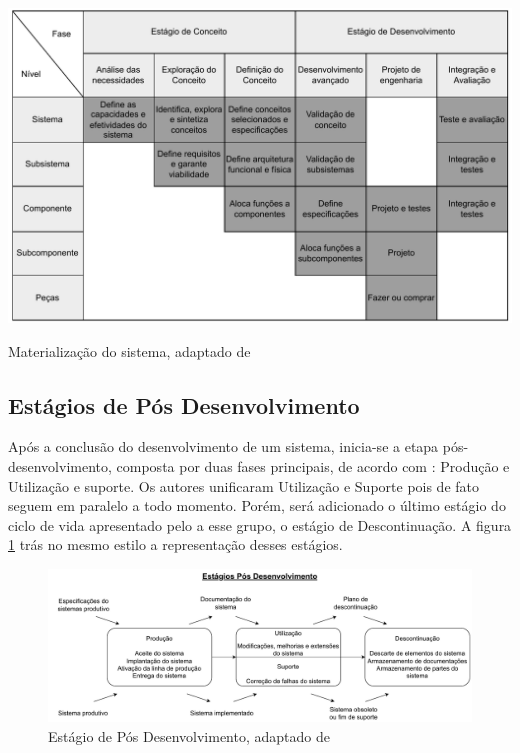 	\begin{table}[H]
		\centering
		\includegraphics[width=\textwidth]{./figuras/systemMaterialization.pdf}
		\caption{Materialização do sistema, adaptado de \citep{kossiakoff2020systems}}
		\label{tab:revisao:systemMaterialization}
	\end{table}

	\subsection{Estágios de Pós Desenvolvimento}\label{sec:revisao:ciclodevida:posDev}
	Após a conclusão do desenvolvimento de um sistema, inicia-se a etapa pós-desenvolvimento, composta por duas fases principais, de acordo com
	\citep{kossiakoff2020systems}: Produção e Utilização e suporte. Os autores unificaram Utilização e Suporte pois de fato seguem em paralelo a todo momento.
	Porém, será adicionado o último estágio do ciclo de vida apresentado pelo \cite{incoseHandbook} a esse grupo, o estágio de Descontinuação. A figura
	\ref{fig:revisao:postDevelopment} trás no mesmo estilo a representação desses estágios.

	\begin{figure}[h]
		\centering
		\includegraphics[width=\textwidth]{./figuras/postDevelopment.pdf}
		\caption{Estágio de Pós Desenvolvimento, adaptado de \citep{kossiakoff2020systems}}
		\label{fig:revisao:postDevelopment}
	\end{figure}
	
